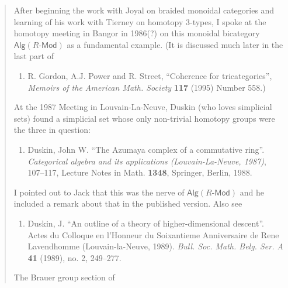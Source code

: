 \documentclass{article}
\def\tightlist{}
\renewcommand{\texttt}[1]{%
  \begingroup
  \ttfamily
  \begingroup\lccode`~=`/\lowercase{\endgroup\def~}{/\discretionary{}{}{}}%
  \begingroup\lccode`~=`[\lowercase{\endgroup\def~}{[\discretionary{}{}{}}%
  \begingroup\lccode`~=`.\lowercase{\endgroup\def~}{.\discretionary{}{}{}}%
  \catcode`/=\active\catcode`[=\active\catcode`.=\active
  \scantokens{#1\noexpand}%
  \endgroup
}
\begin{document}
\begin{quote}
After beginning the work with Joyal on braided monoidal categories and
learning of his work with Tierney on homotopy \(3\)-types, I spoke at
the homotopy meeting in Bangor in 1986(?) on this monoidal bicategory
\(\mathsf{Alg}(R\mbox{-}\mathsf{Mod})\) as a fundamental example. (It is
discussed much later in the last part of

\begin{enumerate}
\def\labelenumi{\arabic{enumi})}
\setcounter{enumi}{39}
\tightlist
\item
  R. Gordon, A.J. Power and R. Street, ``Coherence for tricategories'',
  \emph{Memoirs of the American Math. Society} \textbf{117} (1995)
  Number 558.)
\end{enumerate}

At the 1987 Meeting in Louvain-La-Neuve, Duskin (who loves simplicial
sets) found a simplicial set whose only non-trivial homotopy groups were
the three in question:

\begin{enumerate}
\def\labelenumi{\arabic{enumi})}
\setcounter{enumi}{40}
\tightlist
\item
  Duskin, John W. ``The Azumaya complex of a commutative ring''.
  \emph{Categorical algebra and its applications (Louvain-La-Neuve,
  1987)}, 107--117, Lecture Notes in Math. \textbf{1348}, Springer,
  Berlin, 1988.
\end{enumerate}

I pointed out to Jack that this was the nerve of
\(\mathsf{Alg}(R\mbox{-}\mathsf{Mod})\) and he included a remark about
that in the published version. Also see

\begin{enumerate}
\def\labelenumi{\arabic{enumi})}
\setcounter{enumi}{41}
\tightlist
\item
  Duskin, J. ``An outline of a theory of higher-dimensional descent''.
  Actes du Colloque en l'Honneur du Soixantieme Anniversaire de Rene
  Lavendhomme (Louvain-la-Neuve, 1989). \emph{Bull. Soc. Math. Belg.
  Ser. A} \textbf{41} (1989), no. 2, 249--277.
\end{enumerate}

The Brauer group section of



\end{quote}
\end{document}
